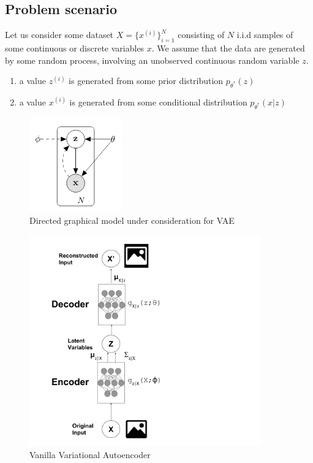 \documentclass[a4paper, 12pt]{book} %
\begin{document}
\subsection{Problem scenario}
Let us consider some dataset $X=\{x^{(i)}\}_{i=1}^{N}$ consisting of $N$ i.i.d samples of some continuous or discrete variables $x$. We assume that the data are generated by some random process, involving an unobserved continuous random variable $z$.
\begin{enumerate}
	\item a value $z^{(i)}$ is generated from some prior distribution $p_{\theta^{*}}(z)$
	\item a value $x^{(i)}$ is generated from some conditional distribution $p_{\theta^{*}}(x|z)$
\end{enumerate}
\begin{figure}[htpb]
	\centering
	\includegraphics[width=4cm]{figures/vae_gm.png}
	\caption{Directed graphical model under consideration for VAE}
	\label{fig:boat1}
\end{figure}




\begin{figure}[htpb]
	\centering
	\includegraphics[width=10cm]{figures/vanilla_vae.png}
	\caption{Vanilla Variational Autoencoder}
	\label{fig:boat1}
\end{figure}
\end{document}

